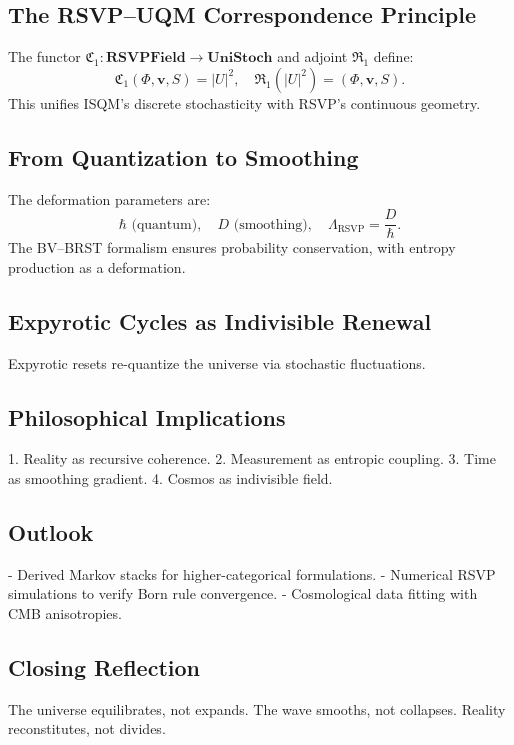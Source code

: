 \documentclass[12pt]{article}
\begin{document}
\subsection{The RSVP–UQM Correspondence Principle}

The functor \(\mathfrak{C}_1: \mathbf{RSVPField} \to \mathbf{UniStoch}\) and adjoint \(\mathfrak{R}_1\) define:
\[
\mathfrak{C}_1(\Phi, \mathbf{v}, S) = |U|^2, \quad \mathfrak{R}_1(|U|^2) = (\Phi, \mathbf{v}, S).
\]
This unifies ISQM’s discrete stochasticity with RSVP’s continuous geometry.

\subsection{From Quantization to Smoothing}

The deformation parameters are:
\[
\hbar \text{ (quantum)}, \quad D \text{ (smoothing)}, \quad \Lambda_{\mathrm{RSVP}} = \frac{D}{\hbar}.
\]
The BV–BRST formalism ensures probability conservation, with entropy production as a deformation.

\subsection{Expyrotic Cycles as Indivisible Renewal}

Expyrotic resets re-quantize the universe via stochastic fluctuations.

\subsection{Philosophical Implications}

1. Reality as recursive coherence.
2. Measurement as entropic coupling.
3. Time as smoothing gradient.
4. Cosmos as indivisible field.

\subsection{Outlook}

- Derived Markov stacks for higher-categorical formulations.
- Numerical RSVP simulations to verify Born rule convergence.
- Cosmological data fitting with CMB anisotropies.

\subsection{Closing Reflection}

The universe equilibrates, not expands. The wave smooths, not collapses. Reality reconstitutes, not divides.
\end{document}
